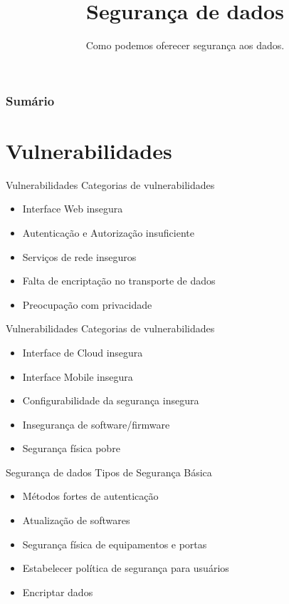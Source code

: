 \documentclass[t]{beamer}
\title{Segurança de dados}
\subtitle{Como podemos oferecer segurança aos dados.}
\begin{document}
\frame{\titlepage}

\begin{frame}
\frametitle{Sumário}
\tableofcontents
\end{frame}

\section{Vulnerabilidades}

\begin{frame}{Vulnerabilidades}
Categorias de vulnerabilidades
\begin{itemize}
	\item Interface Web insegura
	\item Autenticação e Autorização insuficiente
	\item Serviços de rede inseguros
	\item Falta de encriptação no transporte de dados
	\item Preocupação com privacidade
\end{itemize}
\end{frame}

\begin{frame}{Vulnerabilidades}
Categorias de vulnerabilidades
\begin{itemize}
	\item Interface de Cloud insegura
	\item Interface Mobile insegura
	\item Configurabilidade da segurança insegura
	\item Insegurança de software/firmware
	\item Segurança física pobre
\end{itemize}
\end{frame}


\begin{frame}{Segurança de dados}
Tipos de Segurança Básica
\begin{itemize}
	\item Métodos fortes de autenticação
	\item Atualização de softwares
	\item Segurança física de equipamentos e portas
	\item Estabelecer política de segurança para usuários
	\item Encriptar dados
\end{itemize}
\end{frame}
\end{document}
